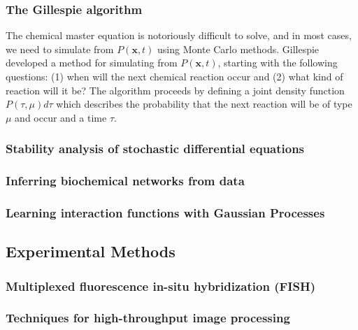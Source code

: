 \documentclass{article}
\begin{document}
\subsubsection{The Gillespie algorithm}

The chemical master equation is notoriously difficult to solve, and in most cases, we need to simulate from $P(\mathbf{x},t)$ using Monte Carlo methods. Gillespie developed a method for simulating from $P(\mathbf{x},t)$, starting with the following questions: (1) when will the next chemical reaction occur and (2) what kind of reaction will it be? The algorithm proceeds by defining a joint density function $P(\tau,\mu)d\tau$ which describes the probability that the next reaction will be of type $\mu$ and occur and a time $\tau$. 

\subsubsection{Stability analysis of stochastic differential equations}

\subsubsection{Inferring biochemical networks from data}

\subsubsection{Learning interaction functions with Gaussian Processes}

\subsection{Experimental Methods}

\subsubsection{Multiplexed fluorescence in-situ hybridization (FISH)}

\subsubsection{Techniques for high-throughput image processing}
\end{document}
